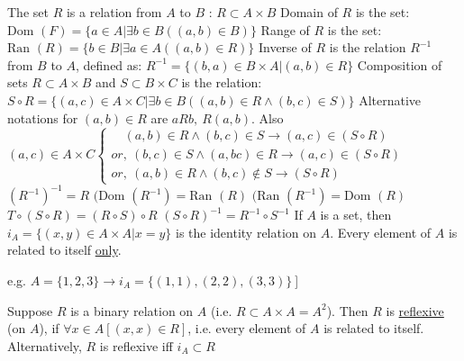 \documentclass[12pt]{article}
\def\Dom{\text{Dom\ }} %
\def\Ran{\text{Ran\ }} %
\begin{document}
\begin{flushleft}
	\textbullet \quad The set $R$ is a relation from $A$ to $B$  :   $R\subset A \times B$ \linebreak 
	\textbullet \quad Domain of $R$ is the set: $\Dom (F) = \{ a \in A | \exists b \in B ((a,b) \in B) \} $ \linebreak 
	\textbullet \quad Range of $R$ is the set: $\Ran (R) = \{ b \in B | \exists a \in A ((a,b) \in R) \} $ \linebreak 
	\textbullet \quad Inverse of $R$ is the relation $R^{-1}$ from $B$ to $A$, defined as: $\displaystyle R^{-1} = \{(b,a) \in B \times A | (a,b) \in R\} $ \linebreak 
	\textbullet \quad Composition of sets $\displaystyle R \subset A \times B$ and $\displaystyle S \subset B \times C$ is the relation: $\displaystyle S \circ R = \{(a,c) \in A \times C | \exists b \in B ( (a,b) \in R \land (b, c) \in S ) \} $ \linebreak 
	Alternative notations for $(a,b) \in R$ are $aRb,\ R(a,b)$. \linebreak 
	\textbullet \quad  Also $\displaystyle (a,c) \in A \times C \begin{cases} 
		\quad (a,b) \in R \land (b, c) \in S \rightarrow (a,c) \in (S \circ R) \\ 
		or, \ (b,c) \in S \land (a,bc) \in R \rightarrow (a,c) \in (S \circ R) \\ 
		or, \ (a,b) \in R \land (b, c) \notin S \rightarrow (S \circ R) 
	\end{cases}$ \linebreak 
	\textbullet \quad $(R^{-1})^{-1} = R$ \linebreak 
	\textbullet \quad $(\Dom(R^{-1})  = \Ran(R) $ \linebreak 
	\textbullet \quad $(\Ran(R^{-1}) = \Dom (R) $ \linebreak 
	\textbullet \quad $ T \circ (S \circ R) = (R \circ S) \circ R $ \linebreak 
	\textbullet \quad $ (S \circ R)^{-1} = R^{-1} \circ S^{-1} $ \linebreak 
	\textbullet \quad If $A$ is a set, then $\displaystyle i_A = \{(x,y) \in A \times A | x = y \}$ is the identity relation on $A$. Every element of $A$ is related to itself \uline{only}. \begin{small}e.g. $\displaystyle A=\{1,2,3\} \rightarrow i_A = \{(1,1),(2,2),(3,3)\}\ $] \linebreak \end{small}
	\textbullet \quad Suppose $R$ is a binary relation on $A$ (i.e. $\displaystyle R \subset A\times A = A^2$). Then $R$ is \uline{reflexive} (on $A$), if $\displaystyle \forall x \in A \left[(x,x) \in R \right]$, i.e. every element of $A$ is related to itself. Alternatively, $R$ is reflexive iff $i_A \subset R$ \linebreak 

\end{flushleft}
\end{document}
